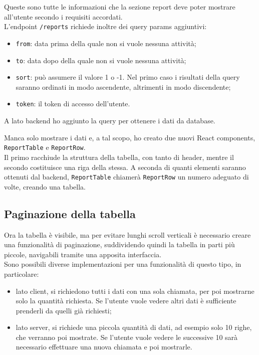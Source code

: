 Queste sono tutte le informazioni che la sezione report deve poter mostrare all'utente secondo i requisiti accordati.\\
L'endpoint \texttt{/reports} richiede inoltre dei query params aggiuntivi:
\begin{itemize}
  \item \texttt{from}: data prima della quale non si vuole nessuna attività;
  \item \texttt{to}: data dopo della quale non si vuole nessuna attività;
  \item \texttt{sort}: può assumere il valore 1 o -1. Nel primo caso i risultati della query saranno ordinati in modo ascendente, altrimenti in modo discendente;
  \item \texttt{token}: il token di accesso dell'utente.
\end{itemize}

A lato backend ho aggiunto la query per ottenere i dati da database.

Manca solo mostrare i dati e, a tal scopo, ho creato due nuovi React components, \texttt{ReportTable} e \texttt{ReportRow}.\\
Il primo racchiude la struttura della tabella, con tanto di header, mentre il secondo costituisce una riga della stessa. A seconda di quanti elementi saranno ottenuti dal backend, \texttt{ReportTable} chiamerà \texttt{ReportRow} un numero adeguato di volte, creando una tabella.

\subsection{Paginazione della tabella}

Ora la tabella è visibile, ma per evitare lunghi scroll verticali è necessario creare una funzionalità di paginazione, suddividendo quindi la tabella in parti più piccole, navigabili tramite una apposita interfaccia.\\
Sono possibili diverse implementazioni per una funzionalità di questo tipo, in particolare:
\begin{itemize}
  \item lato client, si richiedono tutti i dati con una sola chiamata, per poi mostrarne solo la quantità richiesta. Se l'utente vuole vedere altri dati è sufficiente prenderli da quelli già richiesti;
  \item lato server, si richiede una piccola quantità di dati, ad esempio solo 10 righe, che verranno poi mostrate. Se l'utente vuole vedere le successive 10 sarà necessario effettuare una nuova chiamata e poi mostrarle. 
\end{itemize}

